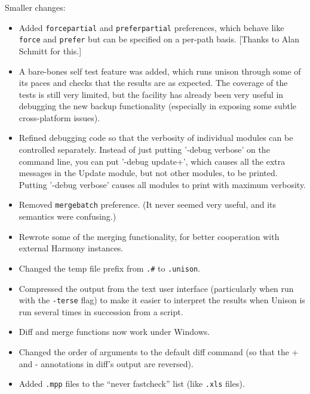 \begin{changesfromversion}{2.17}
\item Smaller changes:
\begin{itemize}
\item Added \verb|forcepartial| and \verb|preferpartial| preferences, which
behave like \verb|force| and \verb|prefer| but can be specified on a
per-path basis. [Thanks to Alan Schmitt for this.]
\item A bare-bones self test feature was added, which runs unison through
  some of its paces and checks that the results are as expected.  The
  coverage of the tests is still very limited, but the facility has already
  been very useful in debugging the new backup functionality (especially in
  exposing some subtle cross-platform issues).
\item Refined debugging code so that the verbosity of individual modules
  can be controlled separately.  Instead of just putting '-debug
  verbose' on the command line, you can put '-debug update+', which
  causes all the extra messages in the Update module, but not other
  modules, to be printed.  Putting '-debug verbose' causes all modules
  to print with maximum verbosity.
\item Removed \verb|mergebatch| preference.  (It never seemed very useful, and
  its semantics were confusing.)
\item Rewrote some of the merging functionality, for better cooperation
  with external Harmony instances.
\item Changed the temp file prefix from \verb|.#| to \verb|.unison|.
\item Compressed the output from the text user interface (particularly
  when run with the \verb|-terse| flag) to make it easier to interpret the
  results when Unison is run several times in succession from a script.
\item Diff and merge functions now work under Windows.
\item Changed the order of arguments to the default diff command (so that
  the + and - annotations in diff's output are reversed).
\item Added \verb|.mpp| files to the ``never fastcheck'' list (like
\verb|.xls| files).
\end{itemize}


\end{changesfromversion}
